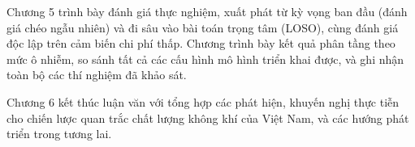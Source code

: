 Chương 5 trình bày đánh giá thực nghiệm, xuất phát từ kỳ vọng ban đầu (đánh giá chéo ngẫu nhiên) và đi sâu vào bài toán trọng tâm (LOSO), cùng đánh giá độc lập trên cảm biến chi phí thấp. Chương trình bày kết quả phân tầng theo mức ô nhiễm, so sánh tất cả các cấu hình mô hình triển khai được, và ghi nhận toàn bộ các thí nghiệm đã khảo sát.

Chương 6 kết thúc luận văn với tổng hợp các phát hiện, khuyến nghị thực tiễn cho chiến lược quan trắc chất lượng không khí của Việt Nam, và các hướng phát triển trong tương lai.
